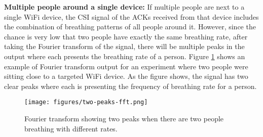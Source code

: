\noindent\textbf{Multiple people around a single device:}
If multiple people are next to a single WiFi device, the CSI signal of the ACKs received from that device includes the combination of breathing patterns of all people around it. However, since the chance is very low that two people have exactly the same breathing rate, after taking the Fourier transform of the signal, there will be multiple peaks in the output where each presents the breathing rate of a person. Figure \ref{fig:two_peak_fft} shows an example of Fourier transform output for an experiment where two people were sitting close to a targeted WiFi device. As the figure shows, the signal has two clear peaks where each is presenting the frequency of breathing rate for a person. 

\begin{figure}[!t]
    \centering
    \texttt{[image: figures/two-peaks-fft.png]}
    \caption{Fourier transform showing two peaks when there are two people breathing with different rates.}
    \label{fig:two_peak_fft}
\end{figure}






